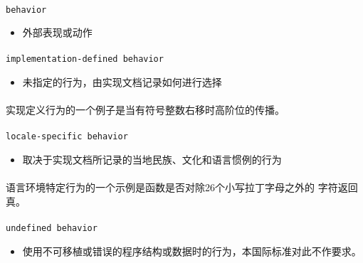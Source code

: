 \paragraph{}
\texttt{behavior}
\begin{itemize}
  \item[]{外部表现或动作}
\end{itemize}

\paragraph{}
\texttt{implementation-defined behavior}
\begin{itemize}
  \item[]{未指定的行为，由实现文档记录如何进行选择}
\end{itemize}

\paragraph{}
\ex* 实现定义行为的一个例子是当有符号整数右移时高阶位的传播。

\paragraph{}
\texttt{locale-specific behavior}
\begin{itemize}
  \item[]{取决于实现文档所记录的当地民族、文化和语言惯例的行为}
\end{itemize}

\paragraph{}
\ex* 语言环境特定行为的一个示例是函数是否对除26个小写拉丁字母之外的
字符返回真。

\paragraph{}
\texttt{undefined behavior}
\begin{itemize}
  \item[]{使用不可移植或错误的程序结构或数据时的行为，本国际标准对此不作要求。}
\end{itemize}

